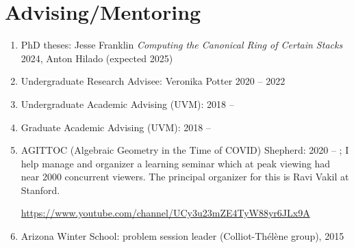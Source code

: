 \documentclass[a4paper,10pt]{article}
\begin{document}
\section*{Advising/Mentoring}
\begin{enumerate}
	\item PhD theses: Jesse Franklin \emph{Computing the Canonical Ring of Certain Stacks} 2024, Anton Hilado (expected 2025)
	\item Undergraduate Research Advisee: Veronika Potter  2020 -- 2022
	\item Undergraduate Academic Advising (UVM): 2018 --
	\item Graduate Academic Advising (UVM): 2018 --
	\item AGITTOC (Algebraic Geometry in the Time of COVID) Shepherd: 2020 -- ; I help manage and organizer a learning seminar which at peak viewing had near 2000 concurrent viewers. The principal organizer for this is Ravi Vakil at Stanford.
	\begin{center}
			 \url{https://www.youtube.com/channel/UCy3u23mZE4TyW88yr6JLx9A}
	\end{center}
   \item  Arizona Winter School:  problem session leader (Colliot-Th\'{e}l\`ene group),  2015  

\end{enumerate}


\iffalse
\end{document}
